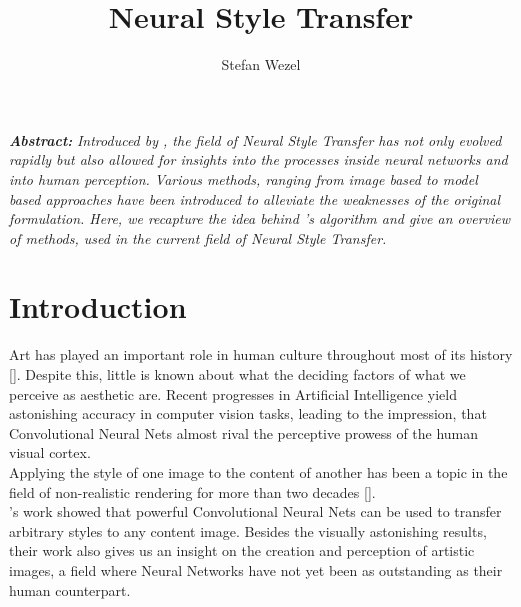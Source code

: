 \documentclass{seminar}
\begin{document}
\renewcommand\toptitle{Seminar: ,,Current Topics in Deep Neural Networks``}
\title{Neural Style Transfer}
\author{Stefan Wezel}
\maketitle


\addvspace{0.5cm}
\emph{\bfseries{Abstract:}}
\emph{Introduced by \cite{gatys2015neural}, the field of Neural Style Transfer has not only evolved rapidly but also allowed for insights into the processes inside neural networks and into human perception. Various methods, ranging from image based to model based approaches have been introduced to alleviate the weaknesses of the original formulation. Here, we recapture the idea behind \cite{gatys2015neural}'s algorithm and give an overview of methods, used in the current field of Neural Style Transfer.}

	
	\tableofcontents
	\newpage
	
\section{Introduction}
Art has played an important role in human culture throughout most of its history [\cite{carroll2004art}]. Despite this, little is known about what the deciding factors of what we perceive as aesthetic are. Recent progresses in Artificial Intelligence yield astonishing accuracy in computer vision tasks, leading to the impression, that Convolutional Neural Nets almost rival the perceptive prowess of the human visual cortex.
\\ 
Applying the style of one image to the content of another has been a topic in the field of non-realistic rendering for more than two decades [\cite{jing2019neural}].
\\
\cite{gatys2015neural}'s work showed that powerful Convolutional Neural Nets can be used to transfer arbitrary styles to any content image. Besides the visually astonishing results, their work also gives us an insight on the creation and perception of artistic images, a field where Neural Networks have not yet been as outstanding as their human counterpart.
\end{document}
